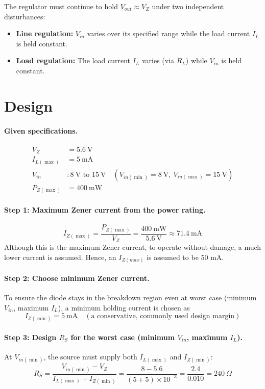 The regulator must continue to hold $V_{out} \approx V_Z$ under two independent
disturbances:
\begin{itemize}
	\item \textbf{Line regulation:} $V_{in}$ varies over its specified range while the load current $I_L$ is held constant.
	\item \textbf{Load regulation:} The load current $I_L$ varies (via $R_L$) while $V_{in}$ is held constant.
\end{itemize}

\section{Design}

\paragraph{Given specifications.}
\begin{align*}
	V_Z &= 5.6\ \text{V} \\
	I_{L(\max)} &= 5\ \text{mA} \\
	V_{in} &: 8\ \text{V to } 15\ \text{V} \quad (V_{in(\min)} = 8\ \text{V},\ V_{in(\max)} = 15\ \text{V}) \\
	P_{Z(\max)} &= 400\ \text{mW}
\end{align*}

\paragraph{Step 1: Maximum Zener current from the power rating.}
\[
I_{Z(\max)} = \frac{P_{Z(\max)}}{V_Z} = \frac{400\ \text{mW}}{5.6\ \text{V}} \approx 71.4\ \text{mA}
\]
Although this is the maximum Zener current, to operate without damage, a much lower current is assumed. Hence, an $I_{Z(max)}$ is assumed to be 50 mA.
\paragraph{Step 2: Choose minimum Zener current.}
To ensure the diode stays in the breakdown region even at worst case
(minimum $V_{in}$, maximum $I_L$), a minimum holding current is chosen as
\[
I_{Z(\min)} = 5\ \text{mA} \quad (\text{a conservative, commonly used design margin})
\]

\paragraph{Step 3: Design $R_S$ for the worst case (minimum $V_{in}$, maximum $I_L$).}
At $V_{in(\min)}$, the source must supply both $I_{L(\max)}$ and $I_{Z(\min)}$:
\[
R_S = \frac{V_{in(\min)} - V_Z}{I_{L(\max)} + I_{Z(\min)}}
= \frac{8 - 5.6}{(5 + 5)\times 10^{-3}}
= \frac{2.4}{0.010} = 240\ \Omega
\]

